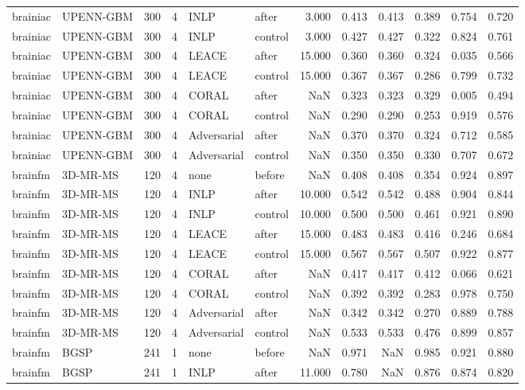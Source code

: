 \begin{tabular}{llrrllrrrrrr}
brainiac & UPENN-GBM & 300 & 4 & INLP & after & 3.000 & 0.413 & 0.413 & 0.389 & 0.754 & 0.720 \\
brainiac & UPENN-GBM & 300 & 4 & INLP & control & 3.000 & 0.427 & 0.427 & 0.322 & 0.824 & 0.761 \\
brainiac & UPENN-GBM & 300 & 4 & LEACE & after & 15.000 & 0.360 & 0.360 & 0.324 & 0.035 & 0.566 \\
brainiac & UPENN-GBM & 300 & 4 & LEACE & control & 15.000 & 0.367 & 0.367 & 0.286 & 0.799 & 0.732 \\
brainiac & UPENN-GBM & 300 & 4 & CORAL & after & NaN & 0.323 & 0.323 & 0.329 & 0.005 & 0.494 \\
brainiac & UPENN-GBM & 300 & 4 & CORAL & control & NaN & 0.290 & 0.290 & 0.253 & 0.919 & 0.576 \\
brainiac & UPENN-GBM & 300 & 4 & Adversarial & after & NaN & 0.370 & 0.370 & 0.324 & 0.712 & 0.585 \\
brainiac & UPENN-GBM & 300 & 4 & Adversarial & control & NaN & 0.350 & 0.350 & 0.330 & 0.707 & 0.672 \\
brainfm & 3D-MR-MS & 120 & 4 & none & before & NaN & 0.408 & 0.408 & 0.354 & 0.924 & 0.897 \\
brainfm & 3D-MR-MS & 120 & 4 & INLP & after & 10.000 & 0.542 & 0.542 & 0.488 & 0.904 & 0.844 \\
brainfm & 3D-MR-MS & 120 & 4 & INLP & control & 10.000 & 0.500 & 0.500 & 0.461 & 0.921 & 0.890 \\
brainfm & 3D-MR-MS & 120 & 4 & LEACE & after & 15.000 & 0.483 & 0.483 & 0.416 & 0.246 & 0.684 \\
brainfm & 3D-MR-MS & 120 & 4 & LEACE & control & 15.000 & 0.567 & 0.567 & 0.507 & 0.922 & 0.877 \\
brainfm & 3D-MR-MS & 120 & 4 & CORAL & after & NaN & 0.417 & 0.417 & 0.412 & 0.066 & 0.621 \\
brainfm & 3D-MR-MS & 120 & 4 & CORAL & control & NaN & 0.392 & 0.392 & 0.283 & 0.978 & 0.750 \\
brainfm & 3D-MR-MS & 120 & 4 & Adversarial & after & NaN & 0.342 & 0.342 & 0.270 & 0.889 & 0.788 \\
brainfm & 3D-MR-MS & 120 & 4 & Adversarial & control & NaN & 0.533 & 0.533 & 0.476 & 0.899 & 0.857 \\
brainfm & BGSP & 241 & 1 & none & before & NaN & 0.971 & NaN & 0.985 & 0.921 & 0.880 \\
brainfm & BGSP & 241 & 1 & INLP & after & 11.000 & 0.780 & NaN & 0.876 & 0.874 & 0.820 \\

\end{tabular}
